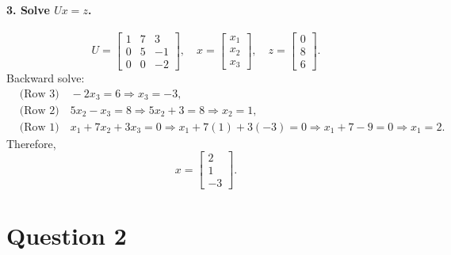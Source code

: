 \documentclass{article}
\begin{document}
\paragraph{3. Solve $Ux = z$.}
$$
    U
    =
    \begin{bmatrix}
        1 & 7 & 3  \\
        0 & 5 & -1 \\
        0 & 0 & -2
    \end{bmatrix},
    \quad
    x
    =
    \begin{bmatrix}x_1\\x_2\\x_3\end{bmatrix},
    \quad
    z
    =
    \begin{bmatrix}0\\8\\6\end{bmatrix}.
$$
Backward solve:
$$
    \begin{aligned}
         & \text{(Row 3)}\quad -2x_3 = 6 \Longrightarrow x_3=-3, \\
         & \text{(Row 2)}\quad 5x_2 - x_3 = 8
        \Longrightarrow
        5x_2 + 3=8
        \Longrightarrow
        x_2=1,                                                   \\
         & \text{(Row 1)}\quad x_1 + 7x_2 + 3x_3=0
        \Longrightarrow
        x_1 +7(1)+3(-3)=0
        \Longrightarrow
        x_1 +7-9=0
        \Longrightarrow
        x_1=2.
    \end{aligned}
$$
Therefore,
$$
    \boxed{
        x
        =
        \begin{bmatrix}
            2 \\
            1 \\
            -3
        \end{bmatrix}
    }.
$$

\newpage
\section*{Question 2}
\end{document}
